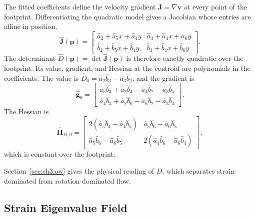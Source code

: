 The fitted coefficients define the velocity gradient
$\mathbf{J} = \nabla\mathbf{v}$ at every point of the footprint. Differentiating the quadratic model gives a Jacobian whose
entries are affine in position,
\begin{equation}
    \hat{\mathbf{J}}(\mathbf{p}) =
    \begin{bmatrix}
        \hat{a}_2 + \hat{a}_5 x + \hat{a}_4 y &
        \hat{a}_3 + \hat{a}_4 x + \hat{a}_6 y \\
        \hat{b}_2 + \hat{b}_5 x + \hat{b}_4 y &
        \hat{b}_3 + \hat{b}_4 x + \hat{b}_6 y
    \end{bmatrix}.
    \label{eq:ch7:Jhat}
\end{equation}
The determinant $\hat{D}(\mathbf{p}) = \det\hat{\mathbf{J}}(\mathbf{p})$
is therefore exactly quadratic over the footprint. Its value, gradient,
and Hessian at the centroid are polynomials in the coefficients. The
value is $\hat{D}_0 = \hat{a}_2\hat{b}_3 - \hat{a}_3\hat{b}_2$, and the
gradient is
\begin{equation}
    \hat{\mathbf{g}}_0 =
    \begin{bmatrix}
        \hat{a}_5\hat{b}_3 + \hat{a}_2\hat{b}_4 - \hat{a}_4\hat{b}_2 - \hat{a}_3\hat{b}_5 \\
        \hat{a}_4\hat{b}_3 + \hat{a}_2\hat{b}_6 - \hat{a}_6\hat{b}_2 - \hat{a}_3\hat{b}_4
    \end{bmatrix}.
    \label{eq:ch7:grad_det}
\end{equation}
The Hessian is
\begin{equation}
    \hat{\mathbf{H}}_{D,0} =
    \begin{bmatrix}
        2(\hat{a}_5\hat{b}_4 - \hat{a}_4\hat{b}_5) &
        \hat{a}_5\hat{b}_6 - \hat{a}_6\hat{b}_5 \\
        \hat{a}_5\hat{b}_6 - \hat{a}_6\hat{b}_5 &
        2(\hat{a}_4\hat{b}_6 - \hat{a}_6\hat{b}_4)
    \end{bmatrix},
    \label{eq:ch7:hess_det}
\end{equation}
which is constant over the footprint.

Section~\ref{sec:ch3:ow} gives the physical reading of $D$, which
separates strain-dominated from rotation-dominated flow.

\subsection{Strain Eigenvalue Field}
\label{sec:ch7:s1_field}

